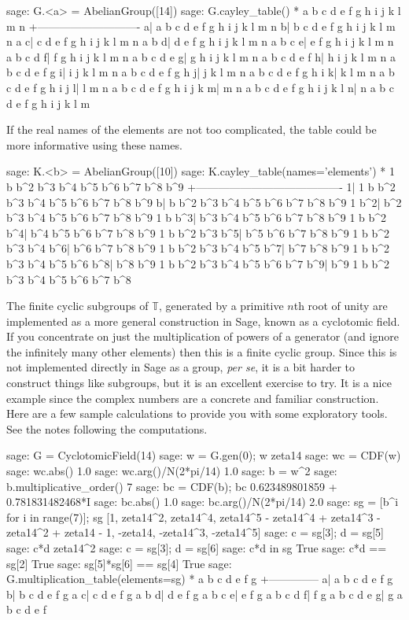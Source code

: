 %
\begin{sageexample}
sage: G.<a> = AbelianGroup([14])
sage: G.cayley_table()
*  a b c d e f g h i j k l m n
 +----------------------------
a| a b c d e f g h i j k l m n
b| b c d e f g h i j k l m n a
c| c d e f g h i j k l m n a b
d| d e f g h i j k l m n a b c
e| e f g h i j k l m n a b c d
f| f g h i j k l m n a b c d e
g| g h i j k l m n a b c d e f
h| h i j k l m n a b c d e f g
i| i j k l m n a b c d e f g h
j| j k l m n a b c d e f g h i
k| k l m n a b c d e f g h i j
l| l m n a b c d e f g h i j k
m| m n a b c d e f g h i j k l
n| n a b c d e f g h i j k l m
\end{sageexample}
%
If the real names of the elements are not too complicated, the table could be more informative using these names.
%
\begin{sageexample}
sage: K.<b> = AbelianGroup([10])
sage: K.cayley_table(names='elements')
  *    1   b b^2 b^3 b^4 b^5 b^6 b^7 b^8 b^9
   +----------------------------------------
  1|   1   b b^2 b^3 b^4 b^5 b^6 b^7 b^8 b^9
  b|   b b^2 b^3 b^4 b^5 b^6 b^7 b^8 b^9   1
b^2| b^2 b^3 b^4 b^5 b^6 b^7 b^8 b^9   1   b
b^3| b^3 b^4 b^5 b^6 b^7 b^8 b^9   1   b b^2
b^4| b^4 b^5 b^6 b^7 b^8 b^9   1   b b^2 b^3
b^5| b^5 b^6 b^7 b^8 b^9   1   b b^2 b^3 b^4
b^6| b^6 b^7 b^8 b^9   1   b b^2 b^3 b^4 b^5
b^7| b^7 b^8 b^9   1   b b^2 b^3 b^4 b^5 b^6
b^8| b^8 b^9   1   b b^2 b^3 b^4 b^5 b^6 b^7
b^9| b^9   1   b b^2 b^3 b^4 b^5 b^6 b^7 b^8
\end{sageexample}
%
%
The finite cyclic subgroups of ${\mathbb T}$, generated by a primitive $n$th root of unity are implemented as a more general construction in Sage, known as a cyclotomic field.  If you concentrate on just the multiplication of powers of a generator (and ignore the infinitely many other elements) then this is a finite cyclic group.  Since this is not implemented directly in Sage as a group, {\it per se}, it is a bit harder to construct things like subgroups, but it is an excellent exercise to try.  It is a nice example since the complex numbers are a concrete and familiar construction.  Here are a few sample calculations to provide you with some exploratory tools.  See the notes following the computations.
%
\begin{sageexample}
sage: G = CyclotomicField(14)
sage: w = G.gen(0); w
zeta14
sage: wc = CDF(w)
sage: wc.abs()
1.0
sage: wc.arg()/N(2*pi/14)
1.0
sage: b = w^2
sage: b.multiplicative_order()
7
sage: bc = CDF(b); bc
0.623489801859 + 0.781831482468*I
sage: bc.abs()
1.0
sage: bc.arg()/N(2*pi/14)
2.0
sage: sg = [b^i for i in range(7)]; sg
[1, zeta14^2, zeta14^4,
zeta14^5 - zeta14^4 + zeta14^3 - zeta14^2 + zeta14 - 1,
-zeta14, -zeta14^3, -zeta14^5]
sage: c = sg[3]; d = sg[5]
sage: c*d
zeta14^2
sage: c = sg[3]; d = sg[6]
sage: c*d in sg
True
sage: c*d == sg[2]
True
sage: sg[5]*sg[6] == sg[4]
True
sage: G.multiplication_table(elements=sg)
*  a b c d e f g
 +--------------
a| a b c d e f g
b| b c d e f g a
c| c d e f g a b
d| d e f g a b c
e| e f g a b c d
f| f g a b c d e
g| g a b c d e f
\end{sageexample}
